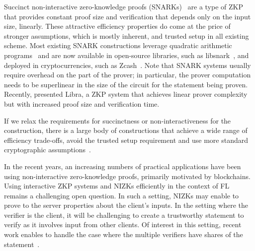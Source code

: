 Succinct
non-interactive zero-knowledge proofs (SNARKs)~\cite{Bitansky:2012:ECR:2090236.2090263} are a type of ZKP that provides constant proof size and verification that depends only on the input size, linearly. These attractive efficiency properties do come at the price of stronger assumptions, which is mostly inherent, %
and trusted setup in all existing scheme. Most existing SNARK constructions leverage quadratic arithmetic programs~\cite{DBLP:conf/eurocrypt/GennaroGP013,DBLP:journals/cacm/ParnoHG016,DBLP:conf/sp/CostelloFHKKNPZ15} and are now available in open-source libraries, such as libsnark~\cite{libsnark}, and deployed in cryptocurrencies, such as Zcash~\cite{DBLP:conf/sp/Ben-SassonCG0MTV14}. Note that SNARK systems usually require overhead on the part of the prover; in particular, the prover computation needs to be superlinear in the size of the circuit for the statement being proven. Recently, \citet{DBLP:conf/crypto/XieZZPS19} presented Libra, a ZKP system that achieves linear prover complexity but with increased proof size and verification time. 

If we relax the requirements for succinctness or non-interactiveness for the construction, there is a large body of constructions that achieve a wide range of efficiency trade-offs, avoid the trusted setup requirement and use more standard cryptographic assumptions~\cite{DBLP:conf/sp/BunzBBPWM18,DBLP:conf/sp/WahbyTSTW18,Ames:2017:LLS:3133956.3134104,DBLP:conf/crypto/Ben-SassonBHR19}.


In the recent years, an increasing numbers of practical applications have been using non-interactive zero-knowledge proofs, primarily motivated by blockchains. Using interactive ZKP systems and NIZKs efficiently in the context of FL remains a challenging open question. In such a setting, NIZKs may enable to prove to the server properties about the client's inputs. In the setting where the verifier is the client, it will be challenging to create a trustworthy statement to verify as it involves input from other clients. Of interest in this setting, recent work enables to handle the case where the multiple verifiers have shares of the statement~\cite{DBLP:conf/crypto/BonehBCGI19}. 



